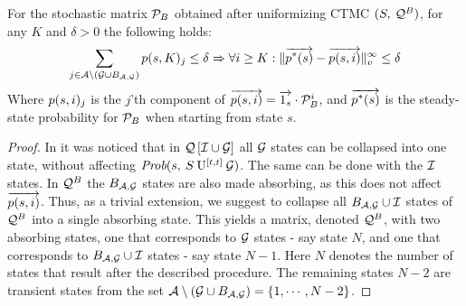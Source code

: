 \documentclass{entcs}
\begin{document}
		\begin{theorem}
			For the stochastic matrix $\mathcal{P}_{B}$ obtained after uniformizing CTMC $(S,\:\mathcal{Q}^{B})$, for any $K$ and $\delta > 0$ the following holds:
				\[
					\sum_{j \in \mathcal{A} \setminus \left( \mathcal{G} \cup B_{ \mathcal{A}, \mathcal{G} } \right)} p(s,K)_{j} \leq \delta \Rightarrow \forall i \geq K : \lVert  \overrightarrow{p^{*}(s)} - \overrightarrow{p(s,i)}  \rVert_{v}^{\infty} \leq \delta
				\]
			Where $p(s,i)_{j}$ is the $j$'th component of $\overrightarrow{p(s,i)} = \overrightarrow{1_{s} } \cdot \mathcal{P}_{B}^{i} $, and $\overrightarrow{p^{*}(s)}$ is the steady-state probability for $\mathcal{P}_{B}$ when starting from state $s$.
		\end{theorem}
		{\small
			\begin{proof}
				In \cite{KatoenKNP_LNCS01} it was noticed that in $\mathcal{Q}\left[ \mathcal{I} \cup \mathcal{G} \right]$ all $\mathcal{G}$ states can be collapsed into one state, without affecting $\mbox{\it Prob}(s, \: S \: \mathrm{U}^{[t,t]} \: \mathcal{G} )$. The same can be done with the $\mathcal{I}$ states. In $\mathcal{Q}^{B}$ the $B_{ \mathcal{A}, \mathcal{G} }$ states are also made absorbing, as this does not affect $\overrightarrow{p(s,i)}$. Thus, as a trivial extension, we suggest to collapse all $B_{ \mathcal{A}, \mathcal{G} } \cup \mathcal{I}$ states of $\mathcal{Q}^{B}$ into a single absorbing state.
				This yields a matrix, denoted $\mathcal{Q}^{B}$, with two absorbing states, one that corresponds to $\mathcal{G}$ states - say state $N$, and one that corresponds to $B_{ \mathcal{A}, \mathcal{G} } \cup \mathcal{I}$ states - say state $N-1$. Here $N$ denotes the number of states that result after the described procedure. The remaining states $N-2$ are transient states from the set $\mathcal{A} \setminus \left( \mathcal{G} \cup B_{ \mathcal{A}, \mathcal{G} } \right) = \{ 1,\cdots,N-2 \}$.
				

\end{proof}}
\end{document}
